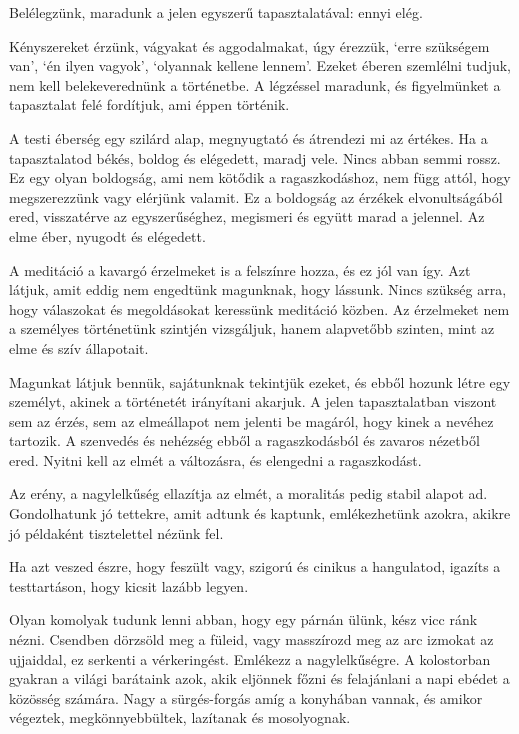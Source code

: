 
Belélegzünk, maradunk a jelen egyszerű tapasztalatával: ennyi elég.

Kényszereket érzünk, vágyakat és aggodalmakat, úgy érezzük, `erre
szükségem van', `én ilyen vagyok', `olyannak kellene lennem'. Ezeket
éberen szemlélni tudjuk, nem kell belekeverednünk a történetbe. A
légzéssel maradunk, és figyelmünket a tapasztalat felé fordítjuk, ami
éppen történik.

A testi éberség egy szilárd alap, megnyugtató és átrendezi mi az
értékes. Ha a tapasztalatod békés, boldog és elégedett, maradj vele.
Nincs abban semmi rossz. Ez egy olyan boldogság, ami nem kötődik a
ragaszkodáshoz, nem függ attól, hogy megszerezzünk vagy elérjünk
valamit. Ez a boldogság az érzékek elvonultságából ered, visszatérve az
egyszerűséghez, megismeri és együtt marad a jelennel. Az elme éber,
nyugodt és elégedett.

A meditáció a kavargó érzelmeket is a felszínre hozza, és ez jól van
így. Azt látjuk, amit eddig nem engedtünk magunknak, hogy lássunk. Nincs
szükség arra, hogy válaszokat és megoldásokat keressünk meditáció
közben. Az érzelmeket nem a személyes történetünk szintjén vizsgáljuk,
hanem alapvetőbb szinten, mint az elme és szív állapotait.

Magunkat látjuk bennük, sajátunknak tekintjük ezeket, és ebből hozunk
létre egy személyt, akinek a történetét irányítani akarjuk. A jelen
tapasztalatban viszont sem az érzés, sem az elmeállapot nem jelenti be
magáról, hogy kinek a nevéhez tartozik. A szenvedés és nehézség ebből a
ragaszkodásból és zavaros nézetből ered. Nyitni kell az elmét a
változásra, és elengedni a ragaszkodást.


Az erény, a nagylelkűség ellazítja az elmét, a moralitás pedig stabil
alapot ad. Gondolhatunk jó tettekre, amit adtunk és kaptunk,
emlékezhetünk azokra, akikre jó példaként tisztelettel nézünk fel.

Ha azt veszed észre, hogy feszült vagy, szigorú és cinikus a hangulatod,
igazíts a testtartáson, hogy kicsit lazább legyen.

Olyan komolyak tudunk lenni abban, hogy egy párnán ülünk, kész vicc ránk
nézni. Csendben dörzsöld meg a füleid, vagy masszírozd meg az arc
izmokat az ujjaiddal, ez serkenti a vérkeringést. Emlékezz a
nagylelkűségre. A kolostorban gyakran a világi barátaink azok, akik
eljönnek főzni és felajánlani a napi ebédet a közösség számára. Nagy a
sürgés-forgás amíg a konyhában vannak, és amikor végeztek,
megkönnyebbültek, lazítanak és mosolyognak.

